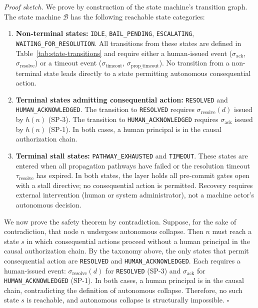 \medskip
\textit{Proof sketch.} We prove by construction of the state machine's transition graph. The state machine $\mathcal{B}$ has the following reachable state categories:

\begin{enumerate}
\item[1.] \textbf{Non-terminal states:} \texttt{IDLE}, \texttt{BAIL\_PENDING}, \texttt{ESCALATING}, \texttt{WAITING\_FOR\_RESOLUTION}. All transitions from these states are defined in Table~\ref{tab:state-transitions} and require either a human-issued event ($\sigma_{\text{ack}}$, $\sigma_{\text{resolve}}$) or a timeout event ($\sigma_{\text{timeout}}$, $\sigma_{\text{prop\_timeout}}$). No transition from a non-terminal state leads directly to a state permitting autonomous consequential action.

\item[2.] \textbf{Terminal states admitting consequential action:} \texttt{RESOLVED} and \texttt{HUMAN\_ACKNOWLEDGED}. The transition to \texttt{RESOLVED} requires $\sigma_{\text{resolve}}(d)$ issued by $h(n)$ (SP-3). The transition to \texttt{HUMAN\_ACKNOWLEDGED} requires $\sigma_{\text{ack}}$ issued by $h(n)$ (SP-1). In both cases, a human principal is in the causal authorization chain.

\item[3.] \textbf{Terminal stall states:} \texttt{PATHWAY\_EXHAUSTED} and \texttt{TIMEOUT}. These states are entered when all propagation pathways have failed or the resolution timeout $\tau_{\text{resolve}}$ has expired. In both states, the \fact{} layer holds all pre-commit gates open with a stall directive; no consequential action is permitted. Recovery requires external intervention (human or system administrator), not a machine actor's autonomous decision.
\end{enumerate}

We now prove the safety theorem by contradiction. Suppose, for the sake of contradiction, that node $n$ undergoes autonomous collapse. Then $n$ must reach a state $s$ in which consequential actions proceed without a human principal in the causal authorization chain. By the taxonomy above, the only states that permit consequential action are \texttt{RESOLVED} and \texttt{HUMAN\_ACKNOWLEDGED}. Each requires a human-issued event: $\sigma_{\text{resolve}}(d)$ for \texttt{RESOLVED} (SP-3) and $\sigma_{\text{ack}}$ for \texttt{HUMAN\_ACKNOWLEDGED} (SP-1). In both cases, a human principal is in the causal chain, contradicting the definition of autonomous collapse. Therefore, no such state $s$ is reachable, and autonomous collapse is structurally impossible. $\square$

